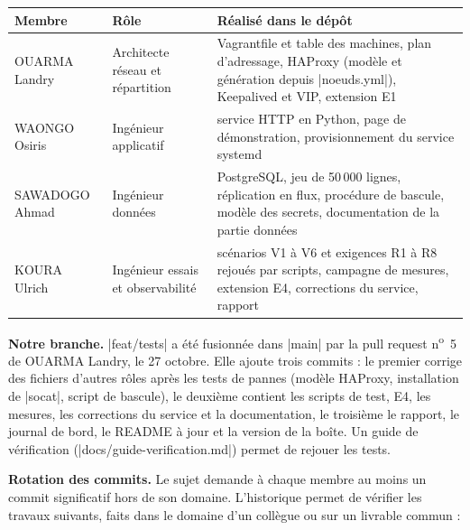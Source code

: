 \documentclass[a4paper,11pt]{article}
\begin{document}
{\small
\begin{longtable}{@{}L{3.0cm}L{3.6cm}L{8.4cm}@{}}
\toprule
\textbf{Membre} & \textbf{Rôle} & \textbf{Réalisé dans le dépôt}\\
\midrule\endhead
OUARMA Landry & Architecte réseau et répartition & Vagrantfile et table des machines, plan d'adressage, HAProxy (modèle et génération depuis |noeuds.yml|), Keepalived et VIP, extension E1\\
WAONGO Osiris & Ingénieur applicatif & service HTTP en Python, page de démonstration, provisionnement du service systemd\\
SAWADOGO Ahmad & Ingénieur données & PostgreSQL, jeu de 50\,000 lignes, réplication en flux, procédure de bascule, modèle des secrets, documentation de la partie données\\
KOURA Ulrich & Ingénieur essais et observabilité & scénarios V1 à V6 et exigences R1 à R8 rejoués par scripts, campagne de mesures, extension E4, corrections du service, rapport\\
\bottomrule
\end{longtable}}

\textbf{Notre branche.} |feat/tests| a été fusionnée dans |main| par la pull request n\textsuperscript{o}~5 de OUARMA Landry, le 27 octobre. Elle ajoute trois commits : le premier corrige des fichiers d'autres rôles après les tests de pannes (modèle HAProxy, installation de |socat|, script de bascule), le deuxième contient les scripts de test, E4, les mesures, les corrections du service et la documentation, le troisième le rapport, le journal de bord, le README à jour et la version de la boîte. Un guide de vérification (|docs/guide-verification.md|) permet de rejouer les tests.

\textbf{Rotation des commits.} Le sujet demande à chaque membre au moins un commit significatif hors de son domaine. L'historique permet de vérifier les travaux suivants, faits dans le domaine d'un collègue ou sur un livrable commun :
\end{document}
